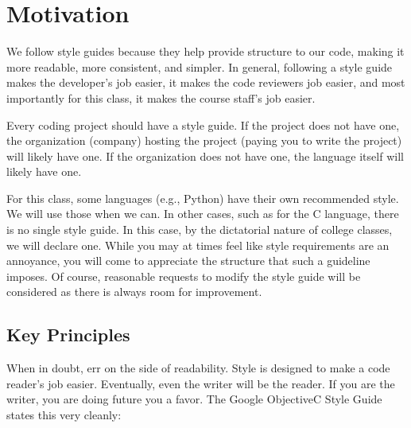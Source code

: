 
\minitoc

\section{Motivation}

We follow style guides because they help provide structure to our code, making it more readable, more consistent, and simpler.  In general, following a style guide makes the developer's job easier, it makes the code reviewers job easier, and most importantly for this class, it makes the course staff's job easier.

Every coding project should have a style guide.  If the project does not have one, the organization (company) hosting the project (paying you to write the project) will likely have one.  If the organization does not have one, the language itself will likely have one.

For this class, some languages (e.g., Python) have their own recommended style.  We will use those when we can.  In other cases, such as for the C language, there is no single style guide\cite{Lott2011}.  In this case, by the dictatorial nature of college classes, we will declare one.
While you may at times feel like style requirements are an annoyance, you will come to appreciate the structure that such a guideline imposes.  Of course, reasonable requests to modify the style guide will be considered as there is always room for improvement.

\subsection{Key Principles}
When in doubt, err on the side of readability.  Style is designed to make a code reader's job easier.  Eventually, even the writer will be the reader.  If you are the writer, you are doing future you a favor.  The Google ObjectiveC Style Guide\cite{GoogleDevelopers2018} states this very cleanly:
    
    
